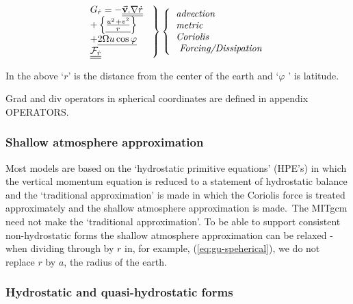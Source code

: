 \begin{equation}
\left. 
\begin{tabular}{l}
$G_{\dot{r}}=-\underline{\underline{\vec{\mathbf{v}}.\nabla \dot{r}}}$ \\ 
$+\left\{ \underline{\frac{u^{_{^{2}}}+v^{2}}{{r}}}\right\} $ \\ 
${+}\underline{{2\Omega u\cos \varphi}}$ \\ 
$\underline{\underline{\mathcal{F}_{\dot{r}}}}$
\end{tabular}
\ \right\} \left\{ 
\begin{tabular}{l}
\textit{advection} \\ 
\textit{metric} \\ 
\textit{Coriolis} \\ 
\textit{\ Forcing/Dissipation}
\end{tabular}
\ \right.  \label{eq:gw-spherical}
\end{equation}
\qquad \qquad \qquad \qquad \qquad

In the above `${r}$' is the distance from the center of the earth and `$\varphi$
' is latitude.

Grad and div operators in spherical coordinates are defined in appendix
OPERATORS.



\subsubsection{Shallow atmosphere approximation}

Most models are based on the `hydrostatic primitive equations' (HPE's) in
which the vertical momentum equation is reduced to a statement of
hydrostatic balance and the `traditional approximation' is made in which the
Coriolis force is treated approximately and the shallow atmosphere
approximation is made.\ The MITgcm need not make the `traditional
approximation'. To be able to support consistent non-hydrostatic forms the
shallow atmosphere approximation can be relaxed - when dividing through by $
r $ in, for example, (\ref{eq:gu-speherical}), we do not replace $r$ by $a$,
the radius of the earth.

\subsubsection{Hydrostatic and quasi-hydrostatic forms}
\label{sec:hydrostatic_and_quasi-hydrostatic_forms}

